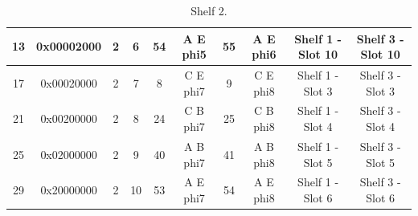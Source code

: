 \documentclass[11pt,letterpaper]{article}
\begin{document}
\begin{table}[h]
\begin{tabular}{|c|c|c|c|c|c|c|c|c|c|}
13                     & 0x00002000            & 2                          & 6                         & 54                            & A E phi5                      & 55                            & A E phi6                      & Shelf 1 - Slot 10       & Shelf 3 - Slot 10       \\ \hline
17                     & 0x00020000            & 2                          & 7                         & 8                             & C E phi7                      & 9                             & C E phi8                      & Shelf 1 - Slot 3        & Shelf 3 - Slot 3        \\ \hline
21                     & 0x00200000            & 2                          & 8                         & 24                            & C B phi7                      & 25                            & C B phi8                      & Shelf 1 - Slot 4        & Shelf 3 - Slot 4        \\ \hline
25                     & 0x02000000            & 2                          & 9                         & 40                            & A B phi7                      & 41                            & A B phi8                      & Shelf 1 - Slot 5        & Shelf 3 - Slot 5        \\ \hline
29                     & 0x20000000            & 2                          & 10                        & 53                            & A E phi7                      & 54                            & A E phi8                      & Shelf 1 - Slot 6        & Shelf 3 - Slot 6        \\ \hline
\end{tabular}
\caption{Shelf 2.}
\label{tab:shelf2}
\end{table}
\end{document}

